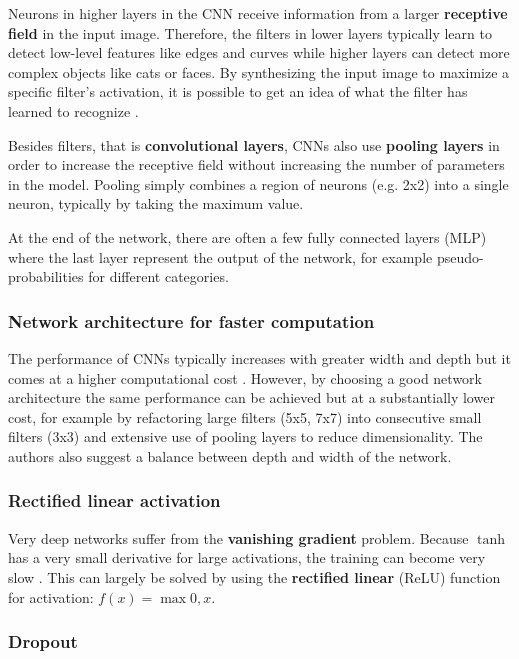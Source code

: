 Neurons in higher layers in the CNN receive information from a larger \textbf{receptive field} in the input image. Therefore, the filters in lower layers typically learn to detect low-level features like edges and curves while higher layers can detect more complex objects like cats or faces.
By synthesizing the input image to maximize a specific filter's activation, it is possible to get an idea of what the filter has learned to recognize \cite{VisualizeCnn}.

Besides filters, that is \textbf{convolutional layers}, CNNs also use \textbf{pooling layers} in order to increase the receptive field without increasing the number of parameters in the model.
Pooling simply combines a region of neurons (e.g. 2x2) into a single neuron, typically by taking the maximum value.

At the end of the network, there are often a few fully connected layers (MLP) where the last layer represent the output of the network, for example pseudo-probabilities for different categories.

\subsubsection{Network architecture for faster computation}

The performance of CNNs typically increases with greater width and depth but it comes at a higher computational cost \cite{InceptionV3}. However, by choosing a good network architecture the same performance can be achieved but at a substantially lower cost, for example by refactoring large filters (5x5, 7x7) into consecutive small filters (3x3) and extensive use of pooling layers to reduce dimensionality. The authors also suggest a balance between depth and width of the network.


\subsubsection{Rectified linear activation}

Very deep networks suffer from the \textbf{vanishing gradient} problem. Because $\tanh$ has a very small derivative for large activations, the training can become very slow \cite{AlexNet}. This can largely be solved by using the \textbf{rectified linear} (ReLU) function for activation: $f(x) = \max{0, x}$.

\subsubsection{Dropout}


